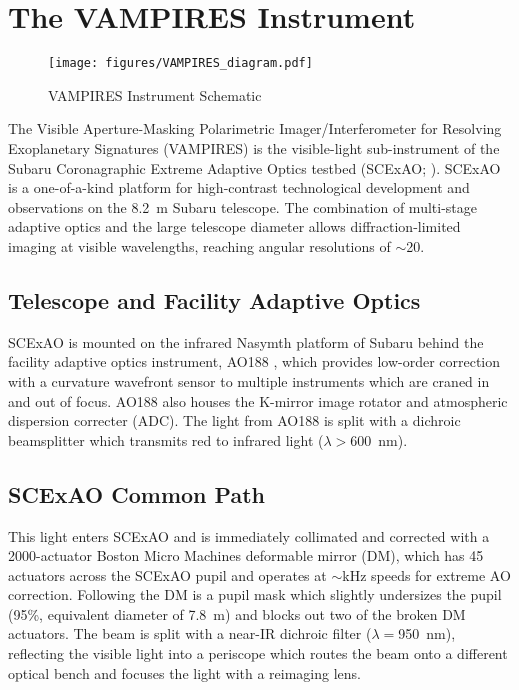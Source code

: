 \section{The VAMPIRES Instrument}\label{sec:design}

\begin{figure*}[t]
    \centering
    \texttt{[image: figures/VAMPIRES\_diagram.pdf]}
    \caption{VAMPIRES Instrument Schematic}
    \label{fig:schematic}
\end{figure*}

The Visible Aperture-Masking Polarimetric Imager/Interferometer for Resolving Exoplanetary Signatures (VAMPIRES) is the visible-light sub-instrument of the Subaru Coronagraphic Extreme Adaptive Optics testbed (SCExAO; \citet{jovanovic_subaru_2015}). SCExAO is a one-of-a-kind platform for high-contrast technological development and observations on the \SI{8.2}{\meter} Subaru telescope. The combination of multi-stage adaptive optics and the large telescope diameter allows diffraction-limited imaging at visible wavelengths, reaching angular resolutions of $\sim$\SI{20}{\mas}. 


\subsection{Telescope and Facility Adaptive Optics}
SCExAO is mounted on the infrared Nasymth platform of Subaru behind the facility adaptive optics instrument, AO188 \citep{minowa_performance_2010}, which provides low-order correction with a curvature wavefront sensor to multiple instruments which are craned in and out of focus. AO188 also houses the K-mirror image rotator and atmospheric dispersion correcter (ADC). The light from AO188 is split with a dichroic beamsplitter which transmits red to infrared light ($\lambda >$\SI{600}{\nano\meter}). 

\subsection{SCExAO Common Path}
This light enters SCExAO and is immediately collimated and corrected with a 2000-actuator Boston Micro Machines deformable mirror (DM), which has 45 actuators across the SCExAO pupil and operates at $\sim$\si{\kilo\hertz} speeds for extreme AO correction. Following the DM is a pupil mask which slightly undersizes the pupil (95\%, equivalent diameter of \SI{7.8}{\meter}) and blocks out two of the broken DM actuators. The beam is split with a near-IR dichroic filter ($\lambda=$\SI{950}{\nano\meter}), reflecting the visible light into a periscope which routes the beam onto a different optical bench and focuses the light with a reimaging lens.

